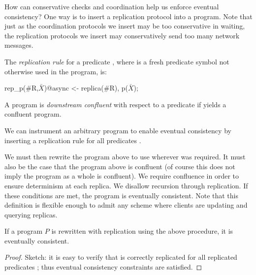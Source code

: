 
How can conservative checks and coordination help us enforce eventual consistency?  One way is to insert a replication protocol into a \lang program.  Note that just as the coordination protocols we insert may be too conservative in waiting, the replication protocols we insert may conservatively send too many network messages.  


\begin{definition}
The {\em replication rule} for a predicate , where  is a fresh predicate symbol not otherwise used in the program, is:

\begin{Dedalus}
rep_p(#R,\(\bar{X}\))@async <- replica(#R), p(\(\bar{X}\));
\end{Dedalus}
\end{definition}

\begin{definition}
A program is {\em downstream confluent} with respect to a predicate  if  yields a confluent program.
\end{definition}

We can instrument an arbitrary \lang program to enable eventual consistency by inserting a replication rule for all predicates .


We must then rewrite the program above  to use  wherever  was required.  It must also be the case that the program above  is confluent (of course this does not imply the program as a whole is confluent).  We require confluence in order to ensure determinism at each replica.  We disallow recursion through replication.  If these conditions are met, the program is eventually consistent.  Note that this definition is flexible enough to admit any scheme where clients are updating and querying replicas.


\begin{theorem}
If a program $P$ is rewritten with replication using the above procedure, it is eventually consistent.
\end{theorem}
\begin{proof}
Sketch: it is easy to verify that  is correctly replicated for all replicated predicates ; thus eventual consistency constraints are satisfied.
\end{proof}
